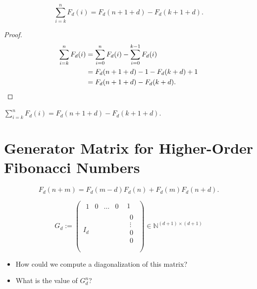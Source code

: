 \documentclass[english,version-2020-11]{uzl-thesis}
\begin{document}
\begin{lemma}
  \[\sum_{i = k}^n F_d(i) = F_d(n + 1 + d) - F_d(k + 1 + d).\]
\end{lemma}

\begin{proof}
  \begin{align*}
    \sum_{i = k}^n F_d(i)
    & = \sum_{i = 0}^n F_d(i) - \sum_{i = 0}^{k-1} F_d(i) \\
    & = F_d(n + 1 + d) - 1 - F_d(k + d) + 1 \\
    & = F_d(n + 1 + d) - F_d(k + d). \qedhere
  \end{align*}
\end{proof}

\begin{corollary}
  $\sum_{i=k}^n F_d(i) = F_d(n + 1 + d) - F_d(k + 1 + d)$.
\end{corollary}

\section{Generator Matrix for Higher-Order Fibonacci Numbers}

\begin{lemma}
  \[
    F_d(n + m) = F_d(m - d) F_d(n) + F_d(m) F_d(n + d).
  \]
\end{lemma}

\begin{definition}
  \[
    G_d := \begin{pmatrix}
      \begin{matrix}
        1 & 0 & \dots & 0
      \end{matrix} & 1 \\
      I_d &
      \begin{matrix}
        0 \\
        \vdots \\
        0 \\
        0 \\
      \end{matrix} \\
    \end{pmatrix} \in \mathbb{N}^{(d+1) \times (d+1)}
  \]
\end{definition}

\begin{itemize}
  \item How could we compute a diagonalization of this matrix?
  \item What is the value of $G_d^n$?
\end{itemize}
\end{document}
